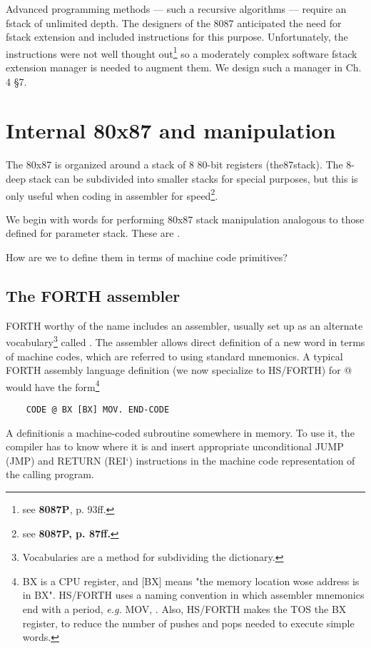 Advanced programming methods — such a recursive algorithms — require an fstack of unlimited depth. The designers of the 8087 anticipated the need for fstack extension and included instructions for this purpose. Unfortunately, the instructions were not well thought out\footnote{see \textbf{8087P}, p. 93ff.} so a moderately complex software fstack extension manager is needed to augment them. We design such a manager in Ch. 4 §7.

\section{Internal 80x87 and manipulation}

The 80x87 is organized around a stack of 8 80-bit registers (the87stack). The 8-deep stack can be subdivided into smaller stacks for special purposes, but this is only useful when coding in assembler for speed\footnote{see \textbf{8087P, p. 87ff.}}.

We begin with words for performing 80x87 stack manipulation analogous to those defined for parameter stack. These are  .

How are we to define them in terms of machine code primitives?

\subsection{The FORTH assembler}

 FORTH worthy of the name includes an assembler, usually set up as an alternate vocabulary\footnote{Vocabularies are a method for subdividing the dictionary.} called . The assembler allows direct definition of a new word in terms of machine codes, which are referred to using standard mnemonics. A typical FORTH assembly language definition (we now specialize to HS/FORTH) for @ would have the form\footnote{BX is a CPU register, and [BX] means "the memory location wose address is in BX". HS/FORTH uses a naming convention in which assembler mnemonics end with a period, \textit{e.g.} MOV, . Also, HS/FORTH makes the TOS the BX register, to reduce the number of pushes and pops needed to execute simple words.}

\begin{lstlisting}
    CODE @ BX [BX] MOV. END-CODE
\end{lstlisting}

A  definitionis a machine-coded subroutine somewhere in memory. To use it, the compiler has to know where it is and insert appropriate unconditional JUMP (JMP) and RETURN (REI‘) instructions in the machine code representation of the calling program.

